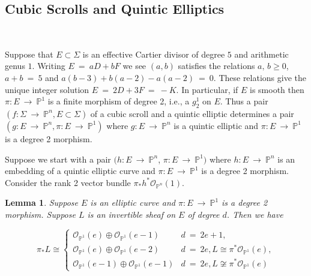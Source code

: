 \documentclass[twoside,12pt,reqno]{amsart}
\theoremstyle{plain}
\newtheorem{lem}[thm]{Lemma}
\theoremstyle{definition}
\newcommand{\PP}{\mathbb{P}}
\def\ps{\vspace{4pt}}
\newcommand{\lt}{\left}
\newcommand{\rt}{\right}
\newcommand{\OO}{\mathcal O}
\begin{document}
\ps

\subsection{Cubic Scrolls and Quintic Elliptics}~\label{subsec-scr51}

\ps


Suppose that $E\subset \Sigma$ is an effective Cartier divisor
of degree $5$ and arithmetic genus $1$.
Writing $E~=~aD + bF$ we see
$(a,b)$ satisfies the relations $a,\, b \geq 0$, $a+b ~=~ 5$ and
$a(b-3)+b(a-2) -a(a-2) ~=~ 0$.  These relations give the unique integer solution
$E~=~2D+3F ~=~ -K$.  In particular, if $E$ is smooth then
$\pi:E~\rightarrow~ \PP^1$ is a finite morphism of degree 2, i.e., a
$g^1_2$ on $E$.  Thus a pair $(f:\Sigma~\rightarrow~ \PP^n, E\subset
\Sigma)$ of a cubic scroll and a quintic elliptic determines a pair
$(g:E~\rightarrow~ \PP^n, \pi:E~\rightarrow~ \PP^1)$ where $g:E~\rightarrow~
\PP^n$ is a quintic elliptic and $\pi:E~\rightarrow~ \PP^1$ is a degree
2 morphism.  

\ps

Suppose we start with a pair $(h:E~\rightarrow~ \PP^n$, $\pi:E~\rightarrow~
\PP^1)$ where $h:E~\rightarrow~ \PP^n$ is an embedding of a quintic
elliptic curve and $\pi:E~\rightarrow~ \PP^1$ is a degree 2 morphism.
Consider the rank 2 vector bundle $\pi_* h^* \OO_{\PP^n}(1)$.  

\ps

\begin{lem} Suppose $E$ is an elliptic curve and $\pi:E~\rightarrow~
\PP^1$ is a degree 2 morphism.  Suppose $L$ is an invertible sheaf on
$E$ of degree $d$.  Then we have

\begin{equation}\pi_* L \cong \lt\{ \begin{array}{ll}
 \OO_{\PP^1}(e) \oplus \OO_{\PP^1}(e-1) & d ~=~ 2e+1, \\
 \OO_{\PP^1}(e) \oplus \OO_{\PP^1}(e-2) & d~=~2e, L\cong
	\pi^*\OO_{\PP^1}(e), \\
 \OO_{\PP^1}(e-1) \oplus \OO_{\PP^1}(e-1) & d~=~2e, L\not\cong \pi^*
	\OO_{\PP^1}(e) 
\end{array} \rt.\end{equation}

\end{lem}
\end{document}
